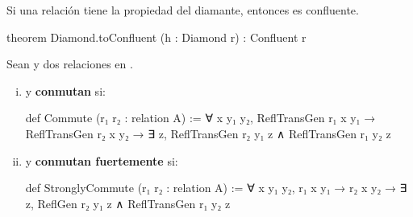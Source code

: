 \begin{thm}
Si una relación tiene la propiedad del diamante, entonces es confluente.
\begin{leancode}
theorem Diamond.toConfluent (h : Diamond r) : Confluent r 
\end{leancode}
\end{thm}

\begin{defn}
Sean  y  dos relaciones en .

\begin{enumerate}[(i)]

\item {} y  \textbf{conmutan} si:

\begin{center}
\end{center}

\begin{leancode}
def Commute (r₁ r₂ : relation A) := 
  ∀ {x y₁ y₂}, ReflTransGen r₁ x y₁ → ReflTransGen r₂ x y₂ → 
    ∃ z, ReflTransGen r₂ y₁ z ∧ ReflTransGen r₁ y₂ z
\end{leancode}


\item {} y  \textbf{conmutan fuertemente} si:

\begin{center}
\end{center}

\begin{leancode}
def StronglyCommute (r₁ r₂ : relation A) :=
  ∀ {x y₁ y₂}, r₁ x y₁ → r₂ x y₂ → ∃ z, ReflGen r₂ y₁ z ∧ ReflTransGen r₁ y₂ z
\end{leancode}

\end{enumerate}

\end{defn}

